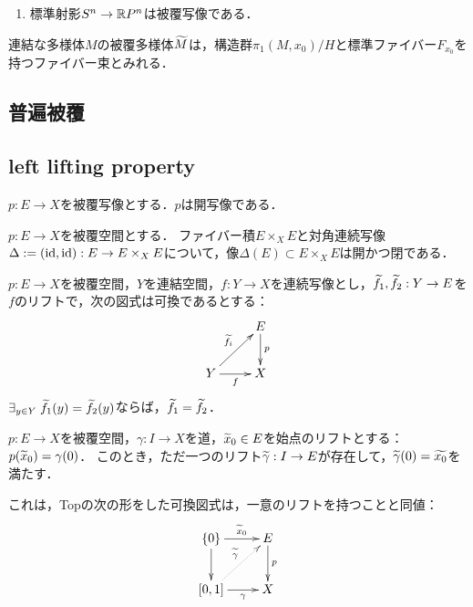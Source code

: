\documentclass[uplatex,dvipdfmx]{jsreport}
\begin{document}
\begin{example}\mbox{}
    \begin{enumerate}
        \item 標準射影$S^n\to\mathbb{R} P^n$は被覆写像である．
    \end{enumerate}
\end{example}

\begin{theorem}
    連結な多様体$M$の被覆多様体$\widetilde{M}$は，構造群$\pi_1(M,x_0)/H$と標準ファイバー$F_{x_0}$を持つファイバー束とみれる．
\end{theorem}

\subsection{普遍被覆}

\subsection{left lifting property}

\begin{proposition}
    $p:E\to X$を被覆写像とする．$p$は開写像である．
\end{proposition}

\begin{lemma}
    $p:E\to X$を被覆空間とする．
    ファイバー積$E\times_XE$と対角連続写像$\Delta:=(\mathrm{id},\mathrm{id}):E\to E\times_XE$について，像$\Delta(E)\subset E\times_XE$は開かつ閉である．
\end{lemma}

\begin{lemma}
    $p:E\to X$を被覆空間，$Y$を連結空間，$f:Y\to X$を連続写像とし，$\widetilde{f_1},\widetilde{f_2}:Y\to E$を$f$のリフトで，次の図式は可換であるとする：
    \[\xymatrix{
        &E\ar[d]^-p\\
        Y\ar[ur]^-{\wt{f}_i}\ar[r]_-f&X
    }\]
    $\exists_{y\in Y}\;\widetilde{f}_1(y)=\widetilde{f}_2(y)$ならば，$\widetilde{f}_1=\widetilde{f}_2$．
\end{lemma}

\begin{lemma}
    $p:E\to X$を被覆空間，$\gamma:I\to X$を道，$\widetilde{x}_0\in E$を始点のリフトとする：$p(\widetilde{x}_0)=\gamma(0)$．
    このとき，ただ一つのリフト$\widetilde{\gamma}:I\to E$が存在して，$\widetilde{\gamma}(0)=\widetilde{x_0}$を満たす．
\end{lemma}
\begin{remarks}
    これは，Topの次の形をした可換図式は，一意のリフトを持つことと同値：
    \[\xymatrix{
        \{0\}\ar[r]^-{\wt{x}_0}\ar[d]&E\ar[d]^-p\\
        {[0,1]}\ar[r]_-\gamma\ar@{.>}[ur]^-{\wt{\gamma}}&X
    }\]
\end{remarks}
\end{document}
